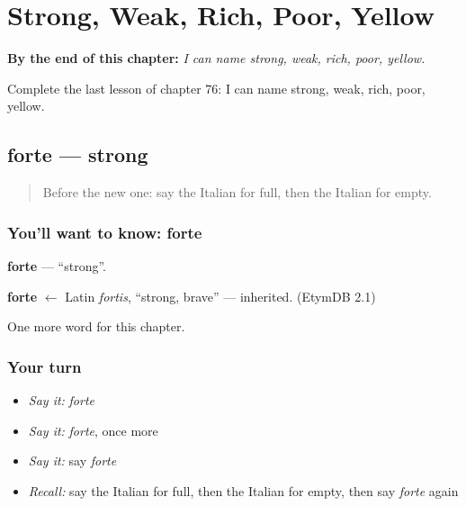 
\chapter{Strong, Weak, Rich, Poor, Yellow}
\label{ch:it-strong-weak-rich-poor-yellow}

\begin{chapteropening}
\textbf{By the end of this chapter:} \emph{I can name strong, weak, rich, poor, yellow.}

Complete the last lesson of chapter 76: I can name strong, weak, rich, poor, yellow.
\end{chapteropening}

\section[forte]{forte — strong}

\label{lesson:IT-C76-forte}



\begin{quote}
Before the new one: say the Italian for full, then the Italian for empty.
\end{quote}

\subsection*{You'll want to know: forte}
\textbf{forte} — \textquotedblleft{}strong\textquotedblright{}.

\begin{cousinweb}
\textbf{forte} $\leftarrow$ Latin \emph{fortis}, \textquotedblleft{}strong, brave\textquotedblright{} — inherited. (EtymDB 2.1)
\end{cousinweb}

\begin{grammarlens}[title={What you've built}]
One more word for this chapter.
\end{grammarlens}

\subsection*{Your turn}
\begin{itemize}
\raggedright
  \item \emph{Say it:} \emph{forte}
  \item \emph{Say it:} \emph{forte}, once more
  \item \emph{Say it:} say \emph{forte}
  \item \emph{Recall:} say the Italian for full, then the Italian for empty, then say \emph{forte} again
\end{itemize}

